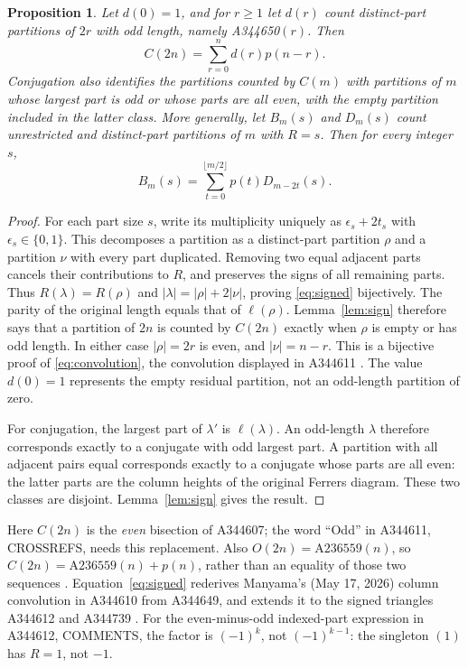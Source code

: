 \documentclass[11pt]{article}
\newtheorem{proposition}[theorem]{Proposition}
\newcommand{\len}{\ell}
\begin{document}
\begin{proposition}\label{prop:identities}
Let $d(0)=1$, and for $r\ge1$ let $d(r)$ count distinct-part partitions
of $2r$ with odd length, namely A344650$(r)$.
Then
\begin{equation}\label{eq:convolution}
 C(2n)=\sum_{r=0}^n d(r)p(n-r).
\end{equation}
Conjugation also identifies the partitions counted by $C(m)$ with
partitions of $m$ whose largest part is odd or whose parts are all even,
with the empty partition included in the latter class.
More generally, let $B_m(s)$ and $D_m(s)$ count unrestricted and
distinct-part partitions of $m$ with $R=s$. Then for every integer $s$,
\begin{equation}\label{eq:signed}
 B_m(s)=\sum_{t=0}^{\lfloor m/2\rfloor}p(t)D_{m-2t}(s).
\end{equation}
\end{proposition}
\begin{proof}
For each part size $s$, write its multiplicity uniquely as
$\epsilon_s+2t_s$ with $\epsilon_s\in\{0,1\}$.
This decomposes a partition as a distinct-part partition $\rho$ and
a partition $\nu$ with every part duplicated. Removing two equal
adjacent parts cancels their contributions to $R$, and preserves the
signs of all remaining parts. Thus $R(\lambda)=R(\rho)$ and
$|\lambda|=|\rho|+2|\nu|$, proving \eqref{eq:signed} bijectively.
The parity of the original
length equals that of $\len(\rho)$. Lemma~\ref{lem:sign} therefore says
that a partition of $2n$ is counted by $C(2n)$ exactly when
$\rho$ is empty or has odd length. In either case $|\rho|=2r$ is even,
and $|\nu|=n-r$. This is a bijective proof of \eqref{eq:convolution},
the convolution displayed in A344611 \cite{a344611,a344650}.
The value $d(0)=1$ represents the empty residual partition, not an
odd-length partition of zero.

For conjugation, the largest part of $\lambda'$ is $\len(\lambda)$.
An odd-length $\lambda$ therefore corresponds exactly to a conjugate
with odd largest part. A partition with all adjacent pairs equal
corresponds exactly to a conjugate whose parts are all even: the latter
parts are the column heights of the original Ferrers diagram.
These two classes are disjoint. Lemma~\ref{lem:sign} gives the result.
\end{proof}

Here $C(2n)$ is the \emph{even} bisection of A344607; the word
``Odd'' in A344611, CROSSREFS, needs this replacement.
Also $O(2n)=\mathrm{A236559}(n)$, so
$C(2n)=\mathrm{A236559}(n)+p(n)$, rather than an equality of those
two sequences \cite{a236559}.
Equation~\eqref{eq:signed} rederives Manyama's (May 17, 2026)
column convolution in A344610 from A344649, and extends it to the
signed triangles A344612 and A344739 \cite{triangles}.
For the even-minus-odd indexed-part expression in A344612, COMMENTS,
the factor is $(-1)^k$, not $(-1)^{k-1}$: the singleton $(1)$ has
$R=1$, not $-1$.
\end{document}

